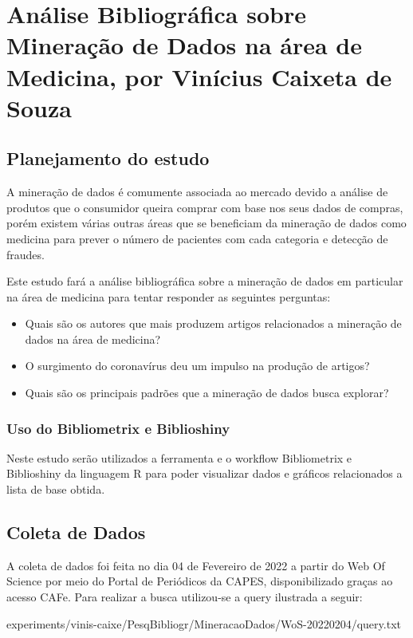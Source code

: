 \chapter{Análise Bibliográfica sobre Mineração de Dados na área de Medicina, por Vinícius Caixeta de Souza}

\section{Planejamento do estudo}

A mineração de dados é comumente associada ao mercado devido a análise de produtos que o consumidor queira comprar com base nos seus dados de compras, porém existem várias outras áreas que se beneficiam da mineração de dados como medicina para prever o número de pacientes com cada categoria e detecção de fraudes.

Este estudo fará a análise bibliográfica sobre a mineração de dados em particular na área de medicina para tentar responder as seguintes perguntas:

\begin{itemize}
    \item Quais são os autores que mais produzem artigos relacionados a mineração de dados na área de medicina?
    \item O surgimento do coronavírus deu um impulso na produção de artigos?
    \item Quais são os principais padrões que a mineração de dados busca explorar?
\end{itemize}

\subsection{Uso do Bibliometrix e Biblioshiny}
Neste estudo serão utilizados a ferramenta e o workflow Bibliometrix e Biblioshiny da linguagem R para poder visualizar dados e gráficos relacionados a lista de base obtida.

\section{Coleta de Dados}
A coleta de dados foi feita no dia 04 de Fevereiro de 2022 a partir do Web Of Science por meio do Portal de Periódicos da CAPES, disponibilizado graças ao acesso CAFe. Para realizar a busca utilizou-se a query ilustrada a seguir:


{experiments/vinis-caixe/PesqBibliogr/MineracaoDados/WoS-20220204/query.txt}

